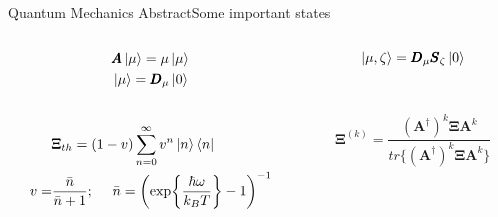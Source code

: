 \begin{frame}{Quantum Mechanics Abstract}{Some important states}
    \begin{columns}

        \begin{column}{0.5\textwidth}
            \begin{equation*}\begin{split}
                &\pmb{A}\ket{\mu}=\mu\ket{\mu}\\
                &\ket{\mu}=\pmb{D}_\mu\ket{0}
            \end{split}\end{equation*}
            \\ \mbox{}
            \begin{equation*}\begin{split}
                &\pmb{\Xi}_{th}=(1-v)\sum_{n=0}^{\infty}v^n\ket{n}\bra{n}\\
                v=&\frac{\bar{n}}{\bar{n}+1};\ \ \ \ 
                \bar{n}=\left(\exp{\frac{\hbar\omega}{k_B T}}-1\right)^{-1}
            \end{split}\end{equation*}
        \end{column}
        \begin{column}{0.5\textwidth}
            \begin{equation*}
                \ket{\mu,\zeta}=\pmb{D}_\mu\pmb{S}_\zeta\ket{0}
            \end{equation*}
            \\ \mbox{} 
            \\
            \begin{equation*}
                \pmb{\Xi}^{(k)}=\frac{(\pmb{A}^\dagger)^k\pmb{\Xi}\pmb{A}^k}
                {tr\{(\pmb{A}^\dagger)^k\pmb{\Xi}\pmb{A}^k\}}
            \end{equation*}
            \mbox{}
            \mbox{}
        \end{column}
    \end{columns}

    \ \\ \mbox{} \\ \ \mbox{}
\end{frame}